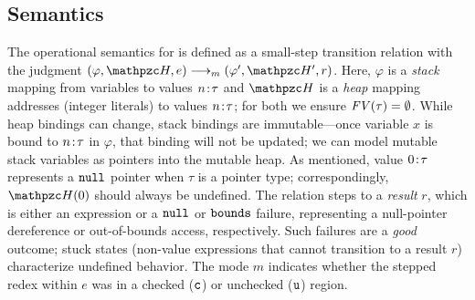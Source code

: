 \subsection{Semantics}\label{sec:semantics}



The operational semantics for \lang is defined as a small-step
transition relation with the judgment $ (\varphi,\heap,e)
\longrightarrow_m (\varphi',\heap',r)$. Here, $\varphi$ is a
\emph{stack} mapping from variables to values ${n}\!:\!{\tau}$ and
$\heap$ is a \emph{heap} mapping addresses (integer literals) to
values ${n}\!:\!{\tau}$; for both we ensure
$\mathit{FV}(\tau)=\emptyset$.
While heap bindings can change, stack bindings are immutable---once
variable $x$ is bound to ${n}\!:\!{\tau}$ in $\varphi$, that binding will not
be updated; we can model mutable stack variables as pointers into the
mutable heap.
As mentioned, value ${0}\!:\!{\tau}$
represents a $\mathtt{null}$ pointer when $\tau$ is a pointer type;
correspondingly, $\heap(0)$ should always be undefined.
The relation steps to a \emph{result} $r$,
which is either an expression or a $\mathtt{null}$ or $\mathtt{bounds}$ failure,
representing a null-pointer dereference or out-of-bounds access,
respectively. Such failures are a \emph{good} outcome; stuck states
(non-value expressions that cannot transition to a result $r$)
characterize undefined behavior.
%
The mode $m$ indicates whether the
stepped redex within $e$ was in a checked ($\texttt{c}$) or
unchecked ($\texttt{u}$) region.

